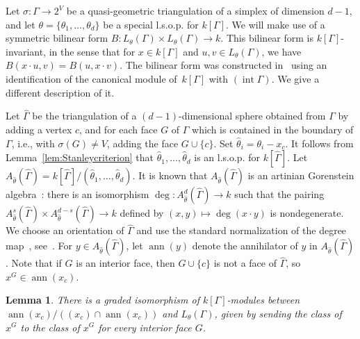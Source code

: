 \documentclass[11pt]{article}
\newtheorem{lemm}[theo]{Lemma}
\theoremstyle{definition}
\numberwithin{equation}{section}
\numberwithin{equation}{section}
\begin{document}
Let $\sigma \colon \Gamma \to 2^V$ be a quasi-geometric triangulation of a simplex of dimension $d-1$, and let $\theta = \{ \theta_1, \dotsc, \theta_d \}$ be a special l.s.o.p. for $k[\Gamma]$.
We will make use of a symmetric 
bilinear form $B \colon L_{\theta}(\Gamma) \times L_{\theta}(\Gamma) \to k$. This bilinear form is $k[\Gamma]$-invariant, in the sense that for $x \in k[\Gamma]$ and $u, v \in L_{\theta}(\Gamma)$, we have $B(x\cdot u, v) = B(u, x \cdot v)$. The bilinear form was constructed in~\cite[Corollary 4.19]{Stanleylocalh} using an identification of the canonical module of~$k[\Gamma]$ with $(\operatorname{int} \Gamma)$. 
We give a different description of it. 

Let $\hat{\Gamma}$ be the triangulation of a $(d-1)$-dimensional sphere obtained from $\Gamma$ by adding a vertex $c$, and for each face $G$ of $\Gamma$ which is  contained in the boundary of $\Gamma$, i.e., with $\sigma(G) \neq V$, adding the face $G \cup \{c\}$. Set $\hat{\theta}_i = \theta_i - x_c$. 
It follows from Lemma~\ref{lem:Stanleycriterion} 
that $\hat{\theta}_1, \dotsc, \hat{\theta}_d$ is an l.s.o.p. for $k[\hat{\Gamma}]$. 
Let $A_{\hat{\theta}}(\hat{\Gamma}) = 
k[\hat{\Gamma}]/(\hat{\theta}_1, \dotsc, \hat{\theta}_d)$. 
It is known that $A_{\hat{\theta}}(\hat{\Gamma})$ is an artinian Gorenstein algebra~\cite[pg. 65]{Stanleybook}: there is an isomorphism $\deg \colon A_{\hat{\theta}}^{d}(\hat{\Gamma}) \to k$ such that the pairing
$A_{\hat{\theta}}^{s}(\hat{\Gamma}) \times  A_{\hat{\theta}}^{d - s}(\hat{\Gamma}) \to k$ defined by
$(x, y) \mapsto \deg(x \cdot y)$ is nondegenerate. We choose an orientation of $\hat{\Gamma}$ and use the standard normalization of the degree map~\cite{BrionStructurePolytopeAlgebra}, see~\cite[Section 2.5]{KaruXiao}.
For $y \in A_{\hat{\theta}}(\hat{\Gamma})$, let $\operatorname{ann}(y)$ denote the annihilator of $y$ in $A_{\hat{\theta}}(\hat{\Gamma})$. Note that if $G$ is an interior face,  then $G \cup \{c\}$ is not a face of $\hat{\Gamma}$, so $x^G \in \operatorname{ann}(x_c)$.

\begin{lemm}\label{lem:annlocalface}
There is a graded isomorphism of $k[\Gamma]$-modules between $\operatorname{ann}(x_c)/((x_c) \cap \operatorname{ann}(x_c))$ and $L_{\theta}(\Gamma)$, given by sending the class of $x^G$ to the class of $x^G$ for every interior face $G$. 
\end{lemm}
\end{document}
